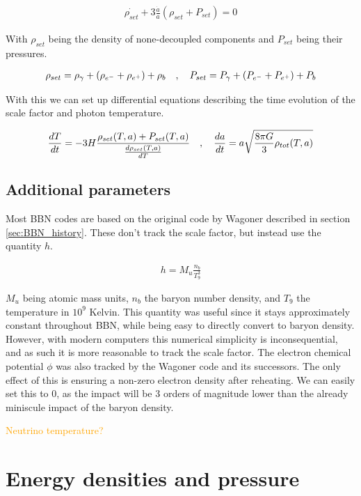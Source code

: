 \begin{align}
    \dot{\rho_{set}}+3\frac{\dot{a}}{a}(\rho_{set} + P_{set})=0
\end{align}

With $\rho_{set}$ being the density of none-decoupled components and $P_{set}$ being their pressures.


\begin{align}
    \rho_{set}=\rho_{\gamma}+(\rho_{e^-}+\rho_{e^+})+\rho_{b}
    \quad , \quad P_{set}=P_{\gamma}+(P_{e^-}+P_{e^+})+P_{b}
\end{align}

With this we can set up differential equations describing the time evolution of the scale factor and photon temperature. 


\begin{align}
    \frac{dT}{dt}=-3H\frac{\rho_{set}(T,a) + P_{set}(T,a)}{\frac{d\rho_{set}(T,a)}{dT}} \quad , \quad \frac{da}{dt}=a\sqrt{\frac{8\pi G}{3}\rho_{tot}(T,a)}
    \label{eq:dBackground}
\end{align}

\subsection{Additional parameters}
Most BBN codes are based on the original code by Wagoner described in section \ref{sec:BBN_history}. These don't track the scale factor, but instead use the quantity $h$.

\begin{align}
    h=M_u\frac{n_{b}}{T^3_9}
\end{align}

$M_u$ being atomic mass units, $n_b$ the baryon number density, and  $T_9$ the temperature in $10^9$ Kelvin. This quantity was useful since it stays approximately constant throughout BBN, while being easy to directly convert to baryon density. However, with modern computers this numerical simplicity is inconsequential, and as such it is more reasonable to track the scale factor.
The electron chemical potential $\phi$ was also tracked by the Wagoner code and its successors. The only effect of this is ensuring a non-zero electron density after reheating. We can easily set this to 0, as the impact will be 3 orders of magnitude lower than the already miniscule impact of the baryon density.

\textcolor{orange}{Neutrino temperature?}


\section{Energy densities and pressure}


